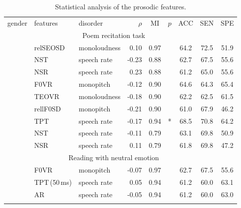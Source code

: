 \begin{table}[tb!]
	\centering
	\begin{threeparttable}
		\caption{Statistical analysis of the prosodic features.}
		\label{tab:ch4_statistical_analysis}
		\footnotesize
		\centering
		\begin{tabular}{l l l r c c c c c} 
		
		\hline\hline\noalign{\smallskip}
		\rowcolor{gray_table}
		gender & features & disorder & $\rho$ & MI & $p$ & ACC & SEN & SPE \\
		\noalign{\smallskip}
		& \multicolumn{6}{c}{Poem recitation task} \\
		\noalign{\smallskip}\hline\noalign{\smallskip}

			\multirow{3}{*}{females}
			& relSEOSD & monoloudness &  0.10 & 0.97 &    & 64.2 & 72.5 & 51.9 \\
			& NST      & speech rate  & -0.23 & 0.88 &    & 62.7 & 67.5 & 55.6 \\
			& NSR      & speech rate  &  0.23 & 0.88 &    & 61.2 & 65.0 & 55.6 \\
			\noalign{\smallskip}

			\multirow{3}{*}{males}
			& F0VR     & monopitch    & -0.12 & 0.90 &    & 64.6 & 64.3 & 65.4 \\
			& TEOVR    & monoloudness & -0.18 & 0.90 &    & 62.2 & 62.5 & 61.5 \\
			& rellF0SD & monopitch    & -0.21 & 0.90 &    & 61.0 & 67.9 & 46.2 \\
			\noalign{\smallskip}

			\multirow{3}{*}{all} 
			& TPT & speech rate & -0.17 & 0.94 & *  & 68.5 & 70.8 & 64.2 \\
			& NST & speech rate & -0.11 & 0.79 &    & 63.1 & 69.8 & 50.9 \\
			& NSR & speech rate &  0.11 & 0.79 &    & 61.8 & 69.8 & 47.2 \\

		\noalign{\smallskip}\hline\noalign{\smallskip}
		& \multicolumn{6}{c}{Reading with neutral emotion} \\
		\noalign{\smallskip}\hline\noalign{\smallskip}
			
			\multirow{3}{*}{females}
			& F0VR          & monopitch   & -0.07 & 0.97 &    & 62.7 & 67.5 & 55.6 \\
			& TPT\,(50\,ms) & speech rate &  0.05 & 0.94 &    & 61.2 & 60.0 & 63.1 \\
			& AR            & speech rate & -0.05 & 0.94 &    & 61.2 & 60.0 & 63.0 \\
			\noalign{\smallskip}


\end{tabular}
\end{threeparttable}
\end{table}
